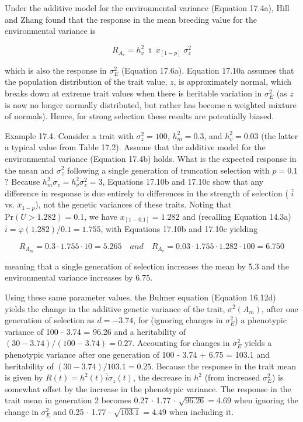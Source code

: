 \documentclass{article}
\begin{document}
Under the additive model for the environmental variance (Equation 17.4a), Hill and Zhang found that the response in the mean breeding value for the environmental variance is

\begin{equation}
R_{A_{v}}=h_{v}^{2}\;\bar{\imath}\;x_{[1-p]}\;\sigma_{z}^{2}
\tag{17.10c}
\label{eq:17_10c}
\end{equation}

which is also the response in  $ \sigma_E^2 $ (Equation 17.6a). Equation 17.10a assumes that the population distribution of the trait value,  $ z $, is approximately normal, which breaks down at extreme trait values when there is heritable variation in  $ \sigma_E^2 $ (as  $ z $ is now no longer normally distributed, but rather has become a weighted mixture of normals). Hence, for strong selection these results are potentially biased.

Example 17.4. Consider a trait with  $ \sigma_z^2 = 100 $,  $ h_m^2 = 0.3 $, and  $ h_v^2 = 0.03 $ (the latter a typical value from Table 17.2). Assume that the additive model for the environmental variance (Equation 17.4b) holds. What is the expected response in the mean and  $ \sigma_z^2 $ following a single generation of truncation selection with  $ p = 0.1 $? Because  $ h_m^2\sigma_z = h_v^2\sigma_z^2 = 3 $, Equations 17.10b and 17.10c show that any difference in response is due entirely to differences in the strength of selection ( $ \bar{i} $ vs.  $ \bar{x}_{1-p} $), not the genetic variances of these traits. Noting that  $ \mathrm{Pr}(U > 1.282) = 0.1 $, we have  $ x_{[1-0.1]} = 1.282 $ and (recalling Equation 14.3a)  $ \bar{i} = \varphi(1.282)/0.1 = 1.755 $, with Equations 17.10b and 17.10c yielding

\begin{equation}
R_{A_{m}}=0.3\cdot1.755\cdot10=5.265\quad and\quad R_{A_{v}}=0.03\cdot1.755\cdot1.282\cdot100=6.750
\end{equation}

meaning that a single generation of selection increases the mean by 5.3 and the environmental variance increases by 6.75.

Using these same parameter values, the Bulmer equation (Equation 16.12d) yields the change in the additive genetic variance of the trait,  $ \sigma^2(A_m) $, after one generation of selection as  $ d = -3.74 $, for (ignoring changes in  $ \sigma_E^2 $) a phenotypic variance of 100 - 3.74 = 96.26 and a heritability of  $ (30 - 3.74)/(100 - 3.74) = 0.27 $. Accounting for changes in  $ \sigma_E^2 $ yields a phenotypic variance after one generation of 100 - 3.74 + 6.75 = 103.1 and heritability of  $ (30 - 3.74)/103.1 = 0.25 $. Because the response in the trait mean is given by  $ R(t) = h^2(t) \bar{i}\sigma_z(t) $, the decrease in  $ h^2 $ (from increased  $ \sigma_E^2 $) is somewhat offset by the increase in the phenotypic variance. The response in the trait mean in generation 2 becomes 0.27  $ \cdot $ 1.77  $ \cdot $  $ \sqrt{96.26} = 4.69 $ when ignoring the change in  $ \sigma_E^2 $ and 0.25  $ \cdot $ 1.77  $ \cdot $  $ \sqrt{103.1} = 4.49 $ when including it.
\end{document}
